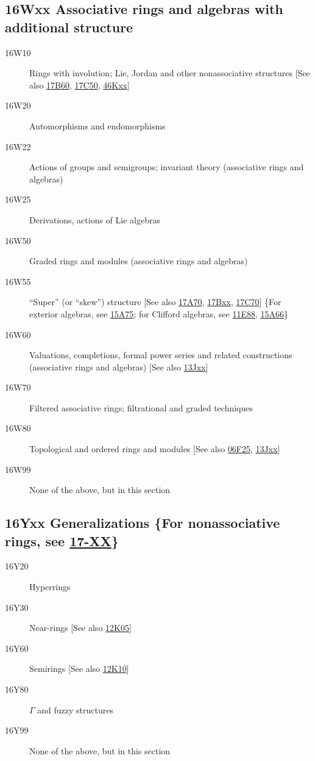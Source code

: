 \subsection*{16Wxx  Associative rings and algebras with additional structure }\label{16Wxx}
\begin{description}  
\item [16W10]\label{16W10} Rings with involution; Lie, Jordan and other nonassociative structures [See also \hyperref[17B60]{17B60}, \hyperref[17C50]{17C50}, \hyperref[46Kxx]{46Kxx}]
\item [16W20]\label{16W20} Automorphisms and endomorphisms
\item [16W22]\label{16W22} Actions of groups and semigroups; invariant theory (associative rings and algebras)
\item [16W25]\label{16W25} Derivations, actions of Lie algebras
\item [16W50]\label{16W50} Graded rings and modules (associative rings and algebras)
\item [16W55]\label{16W55} ``Super'' (or ``skew'') structure [See also \hyperref[17A70]{17A70}, \hyperref[17Bxx]{17Bxx}, \hyperref[17C70]{17C70}] \{For exterior algebras, see \hyperref[15A75]{15A75}; for Clifford algebras, see \hyperref[11E88]{11E88}, \hyperref[15A66]{15A66}\}
\item [16W60]\label{16W60} Valuations, completions, formal power series and related constructions (associative rings and algebras) [See also \hyperref[13Jxx]{13Jxx}]
\item [16W70]\label{16W70} Filtered associative rings; filtrational and graded techniques
\item [16W80]\label{16W80} Topological and ordered rings and modules [See also \hyperref[06F25]{06F25}, \hyperref[13Jxx]{13Jxx}]
\item [16W99]\label{16W99} None of the above, but in this section
\end{description}
\subsection*{16Yxx  Generalizations \{For nonassociative rings, see \hyperref[17-XX]{17-XX}\} }\label{16Yxx}
\begin{description}  
\item [16Y20]\label{16Y20} Hyperrings
\item [16Y30]\label{16Y30} Near-rings  [See also \hyperref[12K05]{12K05}]
\item [16Y60]\label{16Y60} Semirings [See also \hyperref[12K10]{12K10}]
\item [16Y80]\label{16Y80} $\Gamma$ and fuzzy structures
\item [16Y99]\label{16Y99} None of the above, but in this section
\end{description}
